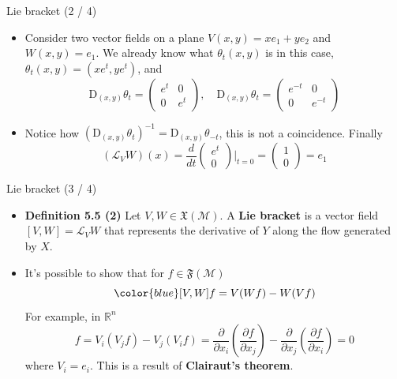 \documentclass{beamer}
\begin{document}
\begin{frame}{Lie bracket (2 / 4)}
    \begin{itemize}
        \item Consider two vector fields on a plane $V(x, y) = x e_1 + ye_2$ and $W(x, y) = e_1$. We already know what $\theta_t(x, y)$ is in this case, $\theta_t(x, y) = (xe^{t}, ye^{t})$, and  
        \begin{equation}
            \text{D}_{(x, y)}\theta_t = \begin{pmatrix}
                e^{t} & 0 \\
                0 & e^{t}
            \end{pmatrix}, \quad \text{D}_{(x, y)}\theta_t = \begin{pmatrix}
                e^{-t} & 0 \\
                0 & e^{-t}
            \end{pmatrix}
        \end{equation}
        \item Notice how $(\text{D}_{(x, y)}\theta_t)^{-1} = \text{D}_{(x, y)}\theta_{-t}$, this is not a coincidence. Finally 
        \begin{equation}
            (\mathcal{L}_{V}W)(x) = \frac{d}{dt} \begin{pmatrix}
                e^{t} \\
                0
            \end{pmatrix} \Big|_{t = 0} = \begin{pmatrix}
                1 \\
                0
            \end{pmatrix} = e_1 
        \end{equation}
    \end{itemize}
\end{frame}

\begin{frame}{Lie bracket (3 / 4)}
    \begin{itemize}
        \item \textbf{Definition 5.5 (2)} Let $V, W \in \mathfrak{X}(\mathcal{M})$. A {\color{blue}\textbf{Lie bracket}} is a vector field $[V, W] = \mathcal{L}_V W$ that represents the derivative of $Y$ along the flow generated by $X$.
        \item It's possible to show that for $f \in \mathfrak{F}(\mathcal{M})$
        \begin{equation}
            \color{blue}[V, W] f = V(Wf) - W(Vf) 
        \end{equation}
        For example, in $\mathbb{R}^{n}$
        \begin{equation}
            [V_i, V_j]f = V_i(V_j f) - V_j(V_i f) = \frac{\partial}{\partial x_i} \left(\frac{\partial f}{\partial x_j}\right) - \frac{\partial}{\partial x_j} \left(\frac{\partial f}{\partial x_i}\right)  = 0
        \end{equation}
        where $V_i = e_i$. This is a result of \textbf{Clairaut's theorem}.
    \end{itemize}
\end{frame}
\end{document}
